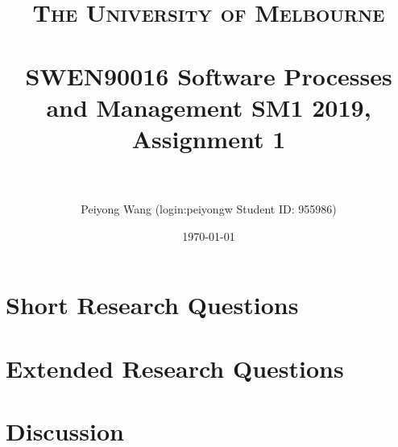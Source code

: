 \documentclass[paper=a4, fontsize=11pt]{scrartcl} %
\title{	
\normalfont \normalsize 
\textsc{The University of Melbourne } \\ [25pt] %
\horrule{0.5pt} \\[0.4cm] %
\huge SWEN90016 Software Processes and Management SM1 2019,
Assignment 1 \\ %
\horrule{2pt} \\[0.5cm] %
}
\author{Peiyong Wang   (login:peiyongw \; Student ID: 955986)} %
\date{\normalsize\today} %
\numberwithin{equation}{section} %
\numberwithin{figure}{section} %
\numberwithin{table}{section} %
\begin{document}
\maketitle %


\section{Short Research Questions}





\section{Extended Research Questions}


\section{Discussion}























\end{document}
